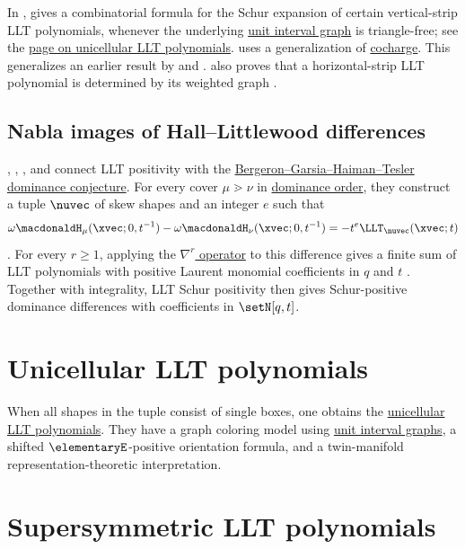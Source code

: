 In \cite{Tom2020x},  gives a combinatorial formula for the
Schur expansion of certain vertical-strip LLT polynomials, whenever the
underlying \hyperref[unitIntervalGraph]{unit interval graph} is triangle-free;
see the \hyperref[unicellularLLT]{page on unicellular LLT polynomials}.
 uses a generalization of
\hyperref[cochargeStatistic]{cocharge}.
This generalizes an earlier result by  and
 \cite{AlexanderssonUhlin2020}.
 also proves that a horizontal-strip LLT polynomial is
determined by its weighted graph \cite{Tom2023}.

\subsection[lltNablaHallLittlewoodCovers]{Nabla images of Hall--Littlewood differences}

, , , and
 connect LLT positivity with the
\hyperref[nablaHallLittlewoodBGHT]{Bergeron--Garsia--Haiman--Tesler
dominance conjecture}.  For every cover $\mu\gtrdot\nu$ in
\hyperref[dominanceOrder]{dominance order}, they construct a tuple $\nuvec$
of skew shapes and an integer $e$ such that
\[
\omega\macdonaldH_\mu(\xvec;0,t^{-1})
-\omega\macdonaldH_\nu(\xvec;0,t^{-1})
=-t^e\LLT_\nuvec(\xvec;t)
\]
\cite[Thm.~35]{GuKangQiuZhang2026x}.  For every $r\geq1$, applying the
\hyperref[nablaOperator]{$\nabla^r$ operator} to this difference gives a finite
sum of LLT polynomials with positive Laurent monomial coefficients in $q$ and
$t$ \cite[Thm.~47]{GuKangQiuZhang2026x}.
Together with integrality, LLT Schur positivity then gives Schur-positive
dominance differences with coefficients in $\setN[q,t]$.



\section[lltUnicellularPointer]{Unicellular LLT polynomials}

When all shapes in the tuple consist of single boxes, one obtains the
\hyperref[unicellularLLT]{unicellular LLT polynomials}.  They have a graph
coloring model using \hyperref[unitIntervalGraph]{unit interval graphs}, a
shifted
$\elementaryE$-positive orientation formula, and a twin-manifold
representation-theoretic interpretation.


\section[lltSuperSym]{Supersymmetric LLT polynomials}

